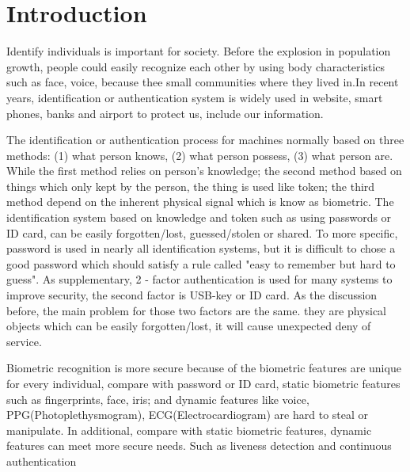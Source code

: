 \documentclass[a4paper,12pt]{article}
\begin{document}

\clearpage
\tableofcontents\label{c}

\clearpage
\section{Introduction}\label{Introduction}
Identify individuals is important for society. Before the explosion in population growth, people could easily recognize each other by using body characteristics such as face, voice, because thee small communities where they lived in\parencite{Jain:2011bio}.In recent years, identification or authentication system is widely used in website, smart phones, banks and airport to protect us, include our information\parencite{Pinto:2018evolution}. 

The identification or authentication process for machines normally based on three methods: (1) what person knows, (2) what person possess, (3) what person are. While the first method relies on person's knowledge; the second method based on things which only kept by the person, the thing is used like token; the third method depend on the inherent physical signal which is know as biometric. The identification system based on knowledge and token such as using passwords or ID card, can be easily forgotten/lost, guessed/stolen or shared\parencite{Jain:2011bio}. To more specific, password is used in nearly all identification systems, but it is difficult to chose a good password which should satisfy a rule called "easy to remember but hard to guess". As supplementary, 2 - factor authentication is used for many systems to improve security, the second factor is USB-key or ID card. As the discussion before, the main problem for those two factors are the same. they are physical objects which can be easily forgotten/lost, it will cause unexpected deny of service\parencite{Blasco:2018feasibility}.

Biometric recognition is more secure because of the biometric features are unique for every individual, compare with password or ID card, static biometric features such as fingerprints, face, iris; and dynamic features like voice, PPG(Photoplethysmogram), ECG(Electrocardiogram) are hard to steal or manipulate\parencite{Agrafioti:2011heart}. In additional, compare with static biometric features, dynamic features can meet more secure needs. Such as liveness detection and continuous authentication\parencite{Agrafioti:2011medical}
\end{document}
